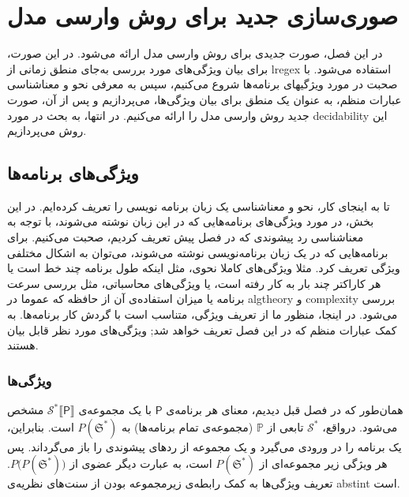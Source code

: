 
\chapter{صوری‌سازی جدید برای روش وارسی مدل}

در این فصل، صورت جدیدی برای روش وارسی مدل ارائه ‌می‌شود. در این صورت، برای بیان ویژگی‌های مورد بررسی به‌جای منطق زمانی از \gls*{lregex} استفاده می‌شود. با صحبت در مورد ویژگیهای برنامه‌ها شروع می‌کنیم، سپس به معرفی نحو و معناشناسی عبارات منظم، به عنوان یک منطق برای بیان ویژگی‌ها، می‌پردازیم و پس از آن، صورت جدید روش وارسی مدل را ارائه می‌کنیم. در انتها، به بحث در مورد \gls*{decidability} این روش می‌پردازیم.


\section{ویژگی‌های برنامه‌ها}
تا به اینجای کار، نحو و معناشناسی یک زبان برنامه نویسی را تعریف کرده‌ایم. در این بخش، در مورد ویژگی‌های برنامه‌هایی که در این زبان نوشته می‌شوند، با توجه به معناشناسی رد پیشوندی که در فصل پیش تعریف کردیم، صحبت می‌کنیم. برای برنامه‌هایی که در یک زبان برنامه‌نویسی نوشته می‌شوند، می‌توان به اشکال مختلفی ویژگی تعریف کرد. مثلا ویژگی‌های کاملا نحوی، مثل اینکه طول برنامه چند خط است یا هر کاراکتر چند بار به کار رفته است، یا ویژگی‌های محاسباتی، مثل بررسی‌ سرعت برنامه یا میزان استفاده‌ی آن از حافظه که عموما در \gls*{algtheory} و \gls*{complexity} بررسی می‌شود. در اینجا، منظور ما از تعریف ویژگی، متناسب است با گردش کار برنامه‌ها. 
به کمک عبارات منظم که در این فصل تعریف خواهد شد; ویژگی‌های مورد نظر قابل بیان هستند.
\subsection{ویژگی‌ها}
همان‌طور که در فصل قبل دیدیم، معنای هر برنامه‌ی $\mathsf{P}$ با یک مجموعه‌ی 
$\mathcal{S^*}\llbracket {\mathsf{P}}\rrbracket$
مشخص می‌شود. درواقع،  
$\mathcal{S^*}$
تابعی
از  
$\mathbb{P}$
(مجموعه‌ی تمام برنامه‌ها) به
$\mathit{P}(\mathfrak{S^*})$
است. بنابراین، یک برنامه را در ورودی می‌گیرد و یک مجموعه از ردهای پیشوندی را باز می‌گرداند. پس هر ویژگی زیر مجموعه‌ای از 
$\mathit{P}(\mathfrak{S^*})$
است، به عبارت دیگر عضوی از
$\mathit{P(P}(\mathfrak{S^*}))$. 
تعریف ویژگی‌ها به کمک رابطه‌ی زیرمجموعه بودن از سنت‌های نظریه‌ی \gls*{abstint}\cite{cousot1} است.

